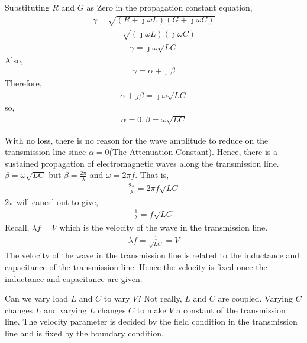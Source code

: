 Substituting $R$ and $G$ as Zero in the propagation constant equation,
\begin{align*}
\gamma = \sqrt{(R + \jmath\omega L)(G + \jmath\omega C)}
\end{align*}
\begin{align*}
= \sqrt{(\jmath\omega L)(\jmath\omega C)}
\end{align*}
\begin{align*}
\gamma = \jmath\omega\sqrt{LC}
\end{align*}
Also,
\begin{align*}
\gamma = \alpha + \jmath\beta
\end{align*} 
Therefore,
\begin{align*}
\alpha + j\beta = \jmath\omega\sqrt{LC}
\end{align*}
so,
\begin{align*}
\alpha = 0, \beta = \omega\sqrt{LC}
\end{align*}

With no loss, there is no reason for the wave amplitude to reduce on the transmission line since $\alpha = 0$(The Attenuation Constant). Hence, there is a sustained propagation of electromagnetic waves along the transmission line.\\
$\beta = \omega\sqrt{LC}$ but $\beta = \frac{2\pi}{\lambda}$ and $\omega = 2\pi f $. That is,
\begin{align*}
\frac{2\pi}{\lambda} = 2\pi f\sqrt{LC}
\end{align*}
$2\pi$ will cancel out to give,
\begin{align*}
\frac{1}{\lambda} =  f\sqrt{LC}
\end{align*}
Recall, $\lambda f = V$ which is the velocity of the wave in the transmission line.
\begin{align*}
\lambda f = \frac{1}{\sqrt{LC}} = V
\end{align*}
The velocity of the wave in the transmission line is related to the inductance and capacitance of the transmission line. Hence the velocity is fixed once the inductance and capacitance are given.

Can we vary load $L$ and $C$ to vary $V$? Not really, $L$ and $C$ are coupled. Varying $C$ changes $L$ and varying $L$ changes $C$ to make $V$ a constant of the transmission line. The velocity parameter is decided by the field condition in the transmission line and is fixed by the boundary condition. 

